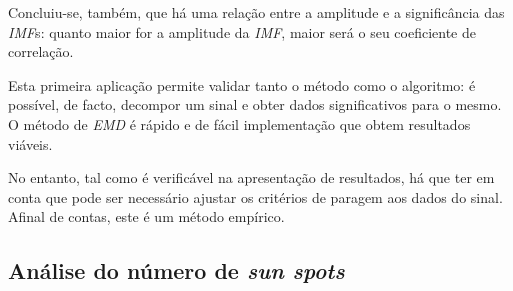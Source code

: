 \documentclass[letterpaper]{article}
\begin{document}
\begin{multicols}{2}
\par Concluiu-se, também, que há uma relação entre a amplitude e a significância das \textit{IMF}s: quanto maior for a amplitude da \textit{IMF}, maior será o seu coeficiente de correlação.

\par Esta primeira aplicação permite validar tanto o método como o algoritmo: é possível, de facto, decompor um sinal e obter dados significativos para o mesmo. 
O método de \textit{EMD} é rápido e de fácil implementação que obtem resultados viáveis.
\par No entanto, tal como  é verificável na apresentação de resultados, há que ter em conta que pode ser necessário ajustar os critérios de paragem aos dados do sinal. Afinal de contas, este é um método empírico.

\subsection{Análise do número de \textit{sun spots}}


\end{multicols}
\end{document}
